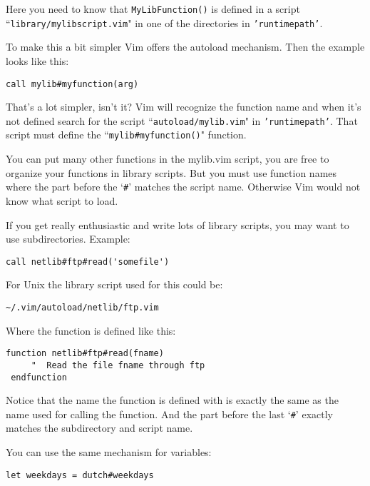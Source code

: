 Here you need to know that \texttt{MyLibFunction()} is defined in a script ``\texttt{library/mylibscript.vim}" in one of the directories in \texttt{'runtimepath'}.

To make this a bit simpler Vim offers the autoload mechanism.
Then the example looks like this:

\begin{Verbatim}[samepage=true]
 call mylib#myfunction(arg)
\end{Verbatim}

That's a lot simpler, isn't it?
Vim will recognize the function name and when it's not defined search for the script ``\texttt{autoload/mylib.vim}" in \texttt{'runtimepath'}.
That script must define the ``\texttt{mylib\#myfunction()}" function.

You can put many other functions in the mylib.vim script, you are free to organize your functions in library scripts.
But you must use function names where the part before the `\texttt{\#}' matches the script name.
Otherwise Vim would not know what script to load.

If you get really enthusiastic and write lots of library scripts, you may want to use subdirectories.
Example:

\begin{Verbatim}[samepage=true]
 call netlib#ftp#read('somefile')
\end{Verbatim}

For Unix the library script used for this could be:

\begin{Verbatim}[samepage=true]
    ~/.vim/autoload/netlib/ftp.vim
\end{Verbatim}

Where the function is defined like this:

\begin{Verbatim}[samepage=true]
 function netlib#ftp#read(fname)
     "  Read the file fname through ftp
 endfunction
\end{Verbatim}

Notice that the name the function is defined with is exactly the same as the name used for calling the function.
And the part before the last `\texttt{\#}' exactly matches the subdirectory and script name.

You can use the same mechanism for variables:

\begin{Verbatim}[samepage=true]
 let weekdays = dutch#weekdays
\end{Verbatim}

